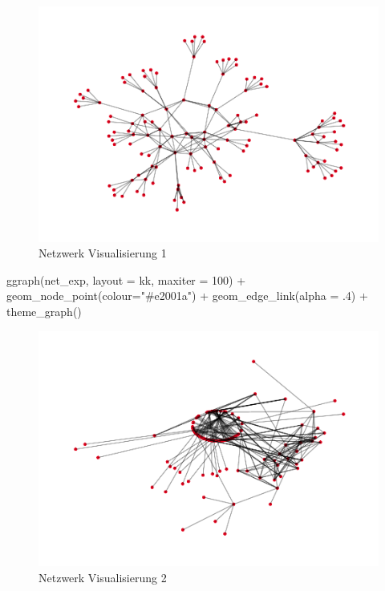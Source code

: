 \documentclass[
  12 pt,
]{article}
\newenvironment{Shaded}{\begin{snugshade}}{\end{snugshade}}
\newcommand{\AttributeTok}[1]{\textcolor[rgb]{0.77,0.63,0.00}{#1}}
\newcommand{\DecValTok}[1]{\textcolor[rgb]{0.00,0.00,0.81}{#1}}
\newcommand{\FunctionTok}[1]{\textcolor[rgb]{0.00,0.00,0.00}{#1}}
\newcommand{\NormalTok}[1]{#1}
\newcommand{\SpecialCharTok}[1]{\textcolor[rgb]{0.00,0.00,0.00}{#1}}
\newcommand{\StringTok}[1]{\textcolor[rgb]{0.31,0.60,0.02}{#1}}
\begin{document}
\begin{figure}
\centering
\includegraphics{Assignment_files/figure-latex/unnamed-chunk-2-1.pdf}
\caption{Netzwerk Visualisierung 1}
\end{figure}

\begin{Shaded}
\begin{Highlighting}[]
\FunctionTok{ggraph}\NormalTok{(net\_exp, }\AttributeTok{layout =} \StringTok{\textquotesingle{}kk\textquotesingle{}}\NormalTok{, }\AttributeTok{maxiter =} \DecValTok{100}\NormalTok{) }\SpecialCharTok{+} 
  \FunctionTok{geom\_node\_point}\NormalTok{(}\AttributeTok{colour=}\StringTok{"\#e2001a"}\NormalTok{) }\SpecialCharTok{+} 
  \FunctionTok{geom\_edge\_link}\NormalTok{(}\AttributeTok{alpha =}\NormalTok{ .}\DecValTok{4}\NormalTok{) }\SpecialCharTok{+}
  \FunctionTok{theme\_graph}\NormalTok{()}
\end{Highlighting}
\end{Shaded}

\begin{figure}
\centering
\includegraphics{Assignment_files/figure-latex/unnamed-chunk-3-1.pdf}
\caption{Netzwerk Visualisierung 2}
\end{figure}
\end{document}

